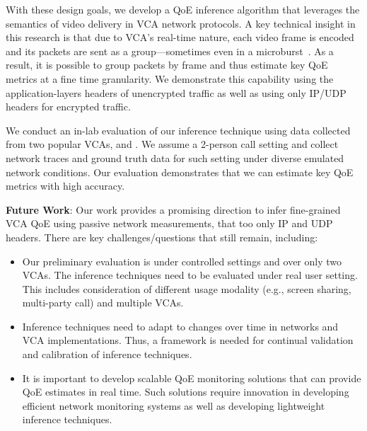 {With these design goals, we develop a QoE inference algorithm that leverages the
semantics of video delivery in VCA network protocols. A key technical insight
in this research is that due to VCA's real-time nature, each video frame is encoded and its 
packets are sent as a group---sometimes even in a microburst~\cite{salsify}. 
As a result, it is possible to group packets by frame and thus estimate key QoE
metrics at a fine time granularity. We demonstrate this capability using the
application-layers headers of unencrypted traffic as well as using only IP/UDP
headers for encrypted traffic. 


We conduct an in-lab evaluation of our inference technique using data collected from two 
popular VCAs, \meet
and \teams. We assume a 2-person call setting and collect network traces and ground truth 
data for such setting under diverse emulated network conditions. Our evaluation 
demonstrates that we 
can estimate key QoE metrics with
high accuracy. 


\textbf{Future Work}: Our work provides a promising direction to infer fine-grained VCA QoE 
using passive network measurements, that too only IP
and UDP headers. There are key challenges/questions that still remain, including:

\begin{itemize}
	\item Our preliminary evaluation is under controlled settings and over only two VCAs. The 
	inference techniques need to be evaluated under real user setting. This 
	includes consideration of different usage modality (e.g., screen sharing, multi-party call) 
	and multiple VCAs.
	\item Inference techniques need to adapt to changes over time in networks and VCA 
	implementations. Thus, a framework is needed for continual validation and calibration of 
	inference 
	techniques. 
	\item It is important to develop scalable QoE monitoring solutions that can provide QoE 
	estimates  in real time. Such solutions require innovation in developing efficient network 
	monitoring systems as well as developing lightweight inference techniques. 
\end{itemize}
}

